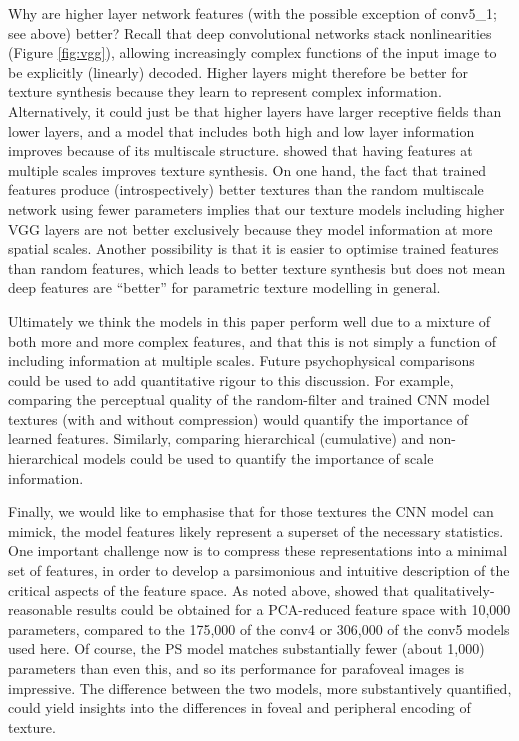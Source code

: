\documentclass[article, 11pt,a4paper,natbib]{apa6}\usepackage[]{graphicx}\usepackage[]{color}
\begin{document}
Why are higher layer network features (with the possible exception of conv5\_1; see above) better?
Recall that deep convolutional networks stack nonlinearities (Figure \ref{fig:vgg}), allowing increasingly complex functions of the input image to be explicitly (linearly) decoded. 
Higher layers might therefore be better for texture synthesis because they learn to represent complex information.
Alternatively, it could just be that higher layers have larger receptive fields than lower layers, and a model that includes both high and low layer information improves because of its multiscale structure.
\citet{ustyuzhaninov_texture_2016} showed that having features at multiple scales improves texture synthesis.
On one hand, the fact that trained features produce (introspectively) better textures than the random multiscale network using fewer parameters implies that our texture models including higher VGG layers are not better exclusively because they model information at more spatial scales.
Another possibility is that it is easier to optimise trained features than random features, which leads to better texture synthesis but does not mean deep features are ``better'' for parametric texture modelling in general.

Ultimately we think the models in this paper perform well due to a mixture of both more and more complex features, and that this is not simply a function of including information at multiple scales.
Future psychophysical comparisons could be used to add quantitative rigour to this discussion.
For example, comparing the perceptual quality of the random-filter and trained CNN model textures (with and without compression) would quantify the importance of learned features.
Similarly, comparing hierarchical (cumulative) and non-hierarchical models could be used to quantify the importance of scale information.

Finally, we would like to emphasise that for those textures the CNN model can mimick, the model features likely represent a superset of the necessary statistics.
One important challenge now is to compress these representations into a minimal set of features, in order to develop a parsimonious and intuitive description of the critical aspects of the feature space.
As noted above, \citet{gatys_texture_2015-1} showed that qualitatively-reasonable results could be obtained for a PCA-reduced feature space with 10,000 parameters, compared to the 175,000 of the conv4 or 306,000 of the conv5 models used here.
Of course, the PS model matches substantially fewer (about 1,000) parameters than even this, and so its performance for parafoveal images is impressive. 
The difference between the two models, more substantively quantified, could yield insights into the differences in foveal and peripheral encoding of texture.
\end{document}
